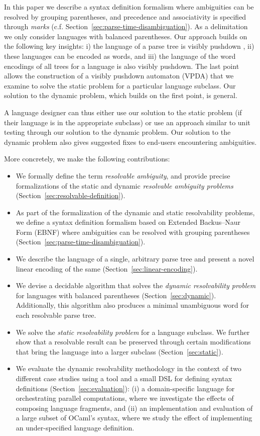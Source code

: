 \documentclass[runningheads]{llncs}
\begin{document}
In this paper we describe a syntax definition formalism where ambiguities can be resolved by grouping parentheses, and precedence and associativity is specified through \emph{marks} (c.f. Section~\ref{sec:parse-time-disambiguation}). As a delimitation we only consider languages with balanced parentheses. Our approach builds on the following key insights: i) the language of a parse tree is visibly pushdown \cite{alurVisiblyPushdownLanguages2004}, ii) these languages can be encoded as words, and iii) the language of the word encodings of all trees for a language is also visibly pushdown. The last point allows the construction of a visibly pushdown automaton (VPDA) that we examine to solve the static problem for a particular language subclass. Our solution to the dynamic problem, which builds on the first point, is general.

A language designer can thus either use our solution to the static problem (if their language is in the appropriate subclass) or use an approach similar to unit testing through our solution to the dynamic problem. Our solution to the dynamic problem also gives suggested fixes to end-users encountering ambiguities.

More concretely, we make the following contributions:

\begin{itemize}
\item We formally define the term \emph{resolvable ambiguity}, and
  provide precise formalizations of the static and dynamic
  \emph{resolvable ambiguity problems}
  (Section~\ref{sec:resolvable-definition}).
\item As part of the formalization of the dynamic and static resolvability problems, we define a syntax definition formalism based on Extended Backus–Naur Form (EBNF) where ambiguities can be resolved with grouping parentheses (Section~\ref{sec:parse-time-disambiguation}).
\item We describe the language of a single, arbitrary parse tree and present a novel linear encoding of the same (Section~\ref{sec:linear-encoding}).
\item We devise a decidable algorithm that solves the \emph{dynamic resolvability problem} for languages with balanced parentheses (Section~\ref{sec:dynamic}). Additionally, this algorithm also produces a minimal unambiguous word for each resolvable parse tree.
\item We solve the \emph{static resolvability problem} for a language subclass. We further show that a resolvable result can be preserved through certain modifications that bring the language into a larger subclass (Section~\ref{sec:static}).
\item We evaluate the dynamic resolvability methodology in the context of two
  different case studies using a tool and a small DSL for defining
  syntax definitions (Section~\ref{sec:evaluation}): (i) a
  domain-specific language for orchestrating parallel
  computations, where we investigate the effects of composing
  language fragments, and (ii) an implementation and evaluation of
  a large subset of OCaml's syntax, where we study the effect of
  implementing an under-specified language definition.
\end{itemize}
\end{document}
